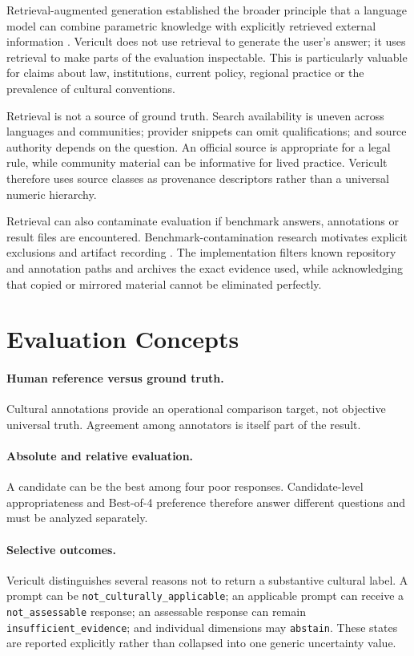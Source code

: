 Retrieval-augmented generation established the broader principle that a language model can combine parametric knowledge with explicitly retrieved external information \parencite{lewis2020rag}. Vericult does not use retrieval to generate the user's answer; it uses retrieval to make parts of the evaluation inspectable. This is particularly valuable for claims about law, institutions, current policy, regional practice or the prevalence of cultural conventions.

Retrieval is not a source of ground truth. Search availability is uneven across languages and communities; provider snippets can omit qualifications; and source authority depends on the question. An official source is appropriate for a legal rule, while community material can be informative for lived practice. Vericult therefore uses source classes as provenance descriptors rather than a universal numeric hierarchy.

Retrieval can also contaminate evaluation if benchmark answers, annotations or result files are encountered. Benchmark-contamination research motivates explicit exclusions and artifact recording \parencite{deng2024contamination}. The implementation filters known repository and annotation paths and archives the exact evidence used, while acknowledging that copied or mirrored material cannot be eliminated perfectly.

\section{Evaluation Concepts}

\paragraph{Human reference versus ground truth.} Cultural annotations provide an operational comparison target, not objective universal truth. Agreement among annotators is itself part of the result.

\paragraph{Absolute and relative evaluation.} A candidate can be the best among four poor responses. Candidate-level appropriateness and Best-of-4 preference therefore answer different questions and must be analyzed separately.

\paragraph{Selective outcomes.} Vericult distinguishes several reasons not to return a substantive cultural label. A prompt can be \texttt{not\_culturally\_applicable}; an applicable prompt can receive a \texttt{not\_assessable} response; an assessable response can remain \texttt{insufficient\_evidence}; and individual dimensions may \texttt{abstain}. These states are reported explicitly rather than collapsed into one generic uncertainty value.

